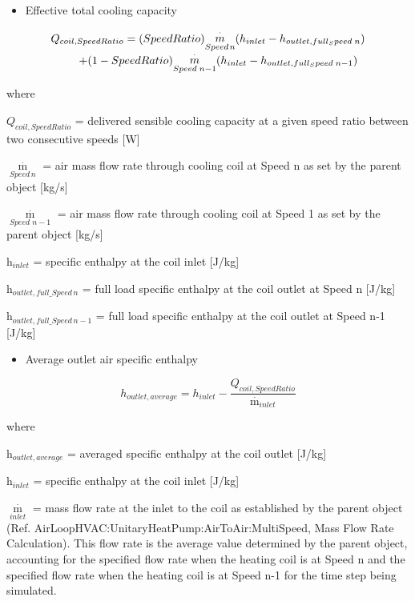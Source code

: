 \begin{itemize}
  \item Effective total cooling capacity
\end{itemize}

\begin{equation}
\begin{array}{l}
{Q_{coil,SpeedRatio}} = (SpeedRatio){\mathop m\limits^\cdot_{Speed{\kern 1pt} n}}({h_{inlet}} - {h_{outlet,full_Speed\;n}}) \\
\;\;\;\;\;\;\;\;\; + (1 - SpeedRatio){\mathop m\limits^\cdot_{Speed\;n - 1}}({h_{inlet}} - {h_{outlet,full_Speed\;n - 1}})
\end{array}
\end{equation}

where

\({Q_{coil,SpeedRatio}}\) = delivered sensible cooling capacity at a given speed ratio between two consecutive speeds {[}W{]}

\({\mathop m\limits^\cdot_{Speed\,n}}\) = air mass flow rate through cooling coil at Speed n as set by the parent object {[}kg/s{]}

\({\mathop m\limits^\cdot_{Speed\,\,n - 1}}\) = air mass flow rate through cooling coil at Speed 1 as set by the parent object {[}kg/s{]}

h\(_{inlet}\) = specific enthalpy at the coil inlet {[}J/kg{]}

h\(_{outlet,full\_Speed\, n}\) = full load specific enthalpy at the coil outlet at Speed n {[}J/kg{]}

h\(_{outlet,full\_Speed\, n-1}\) = full load specific enthalpy at the coil outlet at Speed n-1 {[}J/kg{]}

\begin{itemize}
  \item Average outlet air specific enthalpy
\end{itemize}

\begin{equation}
  {h_{outlet,average}} = {h_{inlet}} - \frac{Q_{coil,SpeedRatio}}{{\mathop m\limits^\cdot  }_{inlet}}
\end{equation}

where

h\(_{outlet,average}\) = averaged specific enthalpy at the coil outlet {[}J/kg{]}

h\(_{inlet}\) = specific enthalpy at the coil inlet {[}J/kg{]}

\({\mathop m\limits^\cdot_{inlet}}\) = mass flow rate at the inlet to the coil as established by the parent object (Ref. AirLoopHVAC:UnitaryHeatPump:AirToAir:MultiSpeed, Mass Flow Rate Calculation). This flow rate is the average value determined by the parent object, accounting for the specified flow rate when the heating coil is at Speed n and the specified flow rate when the heating coil is at Speed n-1 for the time step being simulated.

